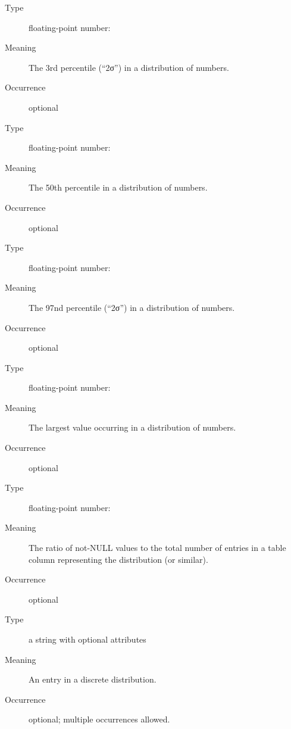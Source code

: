\documentclass[11pt,a4paper]{ivoa}
\begin{document}
\begin{generated}
\begin{bigdescription}
\begin{description}
\end{description}
\item[Element \xmlel{percentile03}]
\begin{description}
\item[Type] floating-point number: 
\item[Meaning] The 3rd percentile (“2σ”) in a distribution of numbers.
\item[Occurrence] optional

\end{description}
\item[Element \xmlel{median}]
\begin{description}
\item[Type] floating-point number: 
\item[Meaning] The 50th percentile in a distribution of numbers.
\item[Occurrence] optional

\end{description}
\item[Element \xmlel{percentile97}]
\begin{description}
\item[Type] floating-point number: 
\item[Meaning] The 97nd percentile (“2σ”) in a distribution of numbers.
\item[Occurrence] optional

\end{description}
\item[Element \xmlel{max}]
\begin{description}
\item[Type] floating-point number: 
\item[Meaning] The largest value occurring in a distribution of numbers.
\item[Occurrence] optional

\end{description}
\item[Element \xmlel{fillFactor}]
\begin{description}
\item[Type] floating-point number: 
\item[Meaning] The ratio of not-NULL values to the total number of entries
               in a table column representing the distribution (or similar).
\item[Occurrence] optional

\end{description}
\item[Element \xmlel{option}]
\begin{description}
\item[Type] a string with optional attributes
\item[Meaning] An entry in a discrete distribution.
\item[Occurrence] optional; multiple occurrences allowed.


\end{description}
\end{bigdescription}
\end{generated}
\end{document}
